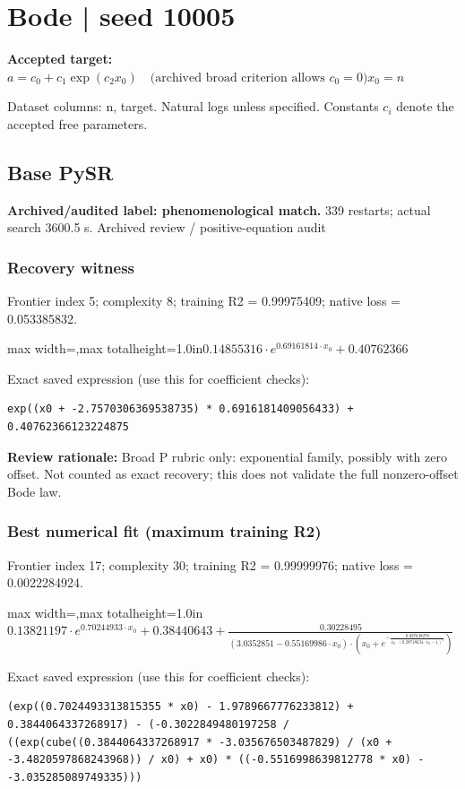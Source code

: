 \documentclass[10pt,letterpaper,landscape]{article}
\begin{document}
\section*{Bode | seed 10005}
\textbf{Accepted target:} $\displaystyle a=c_0+c_1\exp(c_2x_0)\quad\text{(archived broad criterion allows }c_0=0\text{)}$\hfill $x_0=n$\par
{\small Dataset columns: n, target. Natural logs unless specified. Constants $c_i$ denote the accepted free parameters.}\par\medskip
\begin{minipage}[t]{0.485\textwidth}
\subsection*{Base PySR}
\textbf{Archived/audited label: phenomenological match.} 339 restarts; actual search 3600.5 s.
{\small Archived review / positive-equation audit}
\subsubsection*{Recovery witness}
Frontier index 5; complexity 8; training R2 = 0.99975409; native loss = 0.053385832.
\begin{center}\begin{adjustbox}{max width=\linewidth,max totalheight=1.0in}$\displaystyle 0.14855316 \cdot e^{0.69161814 \cdot x_{0}} + 0.40762366$\end{adjustbox}\end{center}
{\scriptsize Exact saved expression (use this for coefficient checks):}
\begin{lstlisting}
exp((x0 + -2.7570306369538735) * 0.6916181409056433) + 0.40762366123224875
\end{lstlisting}
{\small\textbf{Review rationale:} Broad P rubric only: exponential family, possibly with zero offset. Not counted as exact recovery; this does not validate the full nonzero-offset Bode law.}
\subsubsection*{Best numerical fit (maximum training R2)}
Frontier index 17; complexity 30; training R2 = 0.99999976; native loss = 0.0022284924.
\begin{center}\begin{adjustbox}{max width=\linewidth,max totalheight=1.0in}$\displaystyle 0.13821197 \cdot e^{0.70244933 \cdot x_{0}} + 0.38440643 + \frac{0.30228495}{\left(3.0352851 - 0.55169986 \cdot x_{0}\right) \cdot \left(x_{0} + e^{- \frac{0.037638278}{x_{0} \cdot \left(0.28718634 \cdot x_{0} - 1\right)^{3}}}\right)}$\end{adjustbox}\end{center}
{\scriptsize Exact saved expression (use this for coefficient checks):}
\begin{lstlisting}
(exp((0.7024493313815355 * x0) - 1.9789667776233812) + 0.3844064337268917) - (-0.3022849480197258 / ((exp(cube((0.3844064337268917 * -3.035676503487829) / (x0 + -3.4820597868243968)) / x0) + x0) * ((-0.5516998639812778 * x0) - -3.035285089749335)))
\end{lstlisting}
\end{minipage}\hfill
\end{document}
